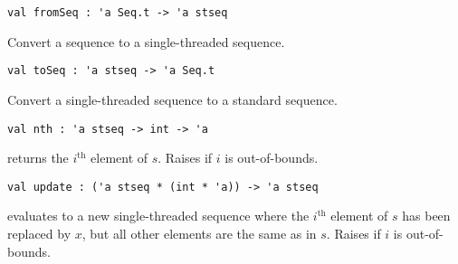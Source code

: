 \begin{cluster}
\label{grp:gr:st-seq-interface:fromSeq}

\begin{gram}[fromSeq]
\label{gr:st-seq-interface:fromSeq}
\begin{verbatim}
val fromSeq : 'a Seq.t -> 'a stseq
\end{verbatim}
Convert a sequence to a single-threaded sequence.

\end{gram}
\end{cluster}

\begin{cluster}
\label{grp:gr:st-seq-interface:toSeq}

\begin{gram}[toSeq]
\label{gr:st-seq-interface:toSeq}
\begin{verbatim}
val toSeq : 'a stseq -> 'a Seq.t
\end{verbatim}
Convert a single-threaded sequence to a standard sequence.

\end{gram}
\end{cluster}

\begin{cluster}
\label{grp:gr:st-seq-interface:nth}

\begin{gram}[nth]
\label{gr:st-seq-interface:nth}
\begin{verbatim}
val nth : 'a stseq -> int -> 'a
\end{verbatim}
 returns the $i^\text{th}$ element of $s$. Raises 
if $i$ is out-of-bounds.

\end{gram}
\end{cluster}

\begin{cluster}
\label{grp:gr:st-seq-interface:update}

\begin{gram}[update]
\label{gr:st-seq-interface:update}
\begin{verbatim}
val update : ('a stseq * (int * 'a)) -> 'a stseq
\end{verbatim}
 evaluates to a new single-threaded sequence where
the $i^\text{th}$ element of $s$ has been replaced by $x$, but all other
elements are the same as in $s$. Raises  if $i$ is out-of-bounds.

\end{gram}
\end{cluster}

